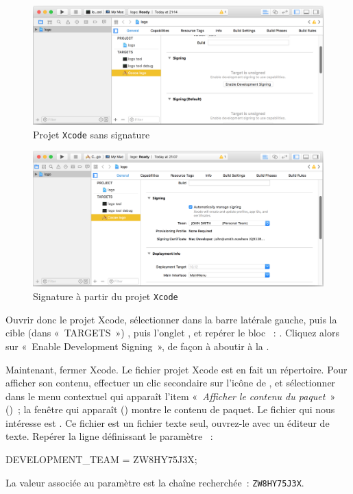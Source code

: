 \begin{figure}[!t]
  \centering
  \includegraphics[width=15cm]{chapitre-cocoa-features/projet-xcode-sans-signature.png}
  \caption{Projet \texttt{Xcode} sans signature}
  \ligne
\end{figure}


\begin{figure}[!t]
  \centering
  \includegraphics[width=15cm]{chapitre-cocoa-features/projet-xcode-avec-signature.png}
  \caption{Signature à partir du projet \texttt{Xcode}}
  \ligne
\end{figure}

Ouvrir donc le projet Xcode, sélectionner  dans la barre latérale gauche, puis la cible (dans «~TARGETS~») , puis l'onglet , et repérer le bloc ~: . Cliquez alors sur «~Enable Development Signing~», de façon à aboutir à la . 

Maintenant, fermer Xcode. Le fichier projet Xcode  est en fait un répertoire. Pour afficher son contenu, effectuer un clic secondaire sur l'icône de , et sélectionner dans le menu contextuel qui apparaît l'item «~\emph{Afficher le contenu du paquet}~» ()~; la fenêtre qui apparaît () montre le contenu de paquet. Le fichier qui nous intéresse est . Ce fichier est un fichier texte seul, ouvrez-le avec un éditeur de texte. Repérer la ligne définissant le paramètre ~:
\begin{SHELL}
DEVELOPMENT\_TEAM = ZW8HY75J3X;
\end{SHELL}
La valeur associée au paramètre  est la chaîne recherchée~: \texttt{ZW8HY75J3X}.


